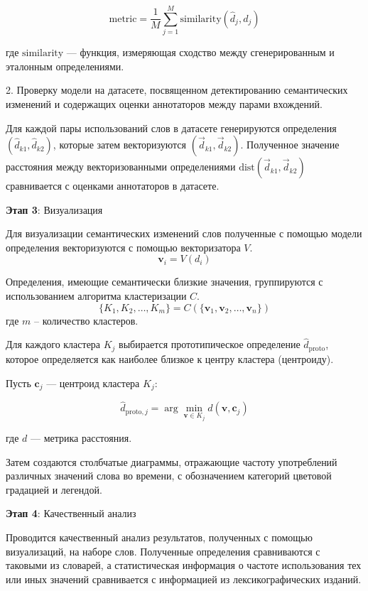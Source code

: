 \documentclass[LI,VKR]{HSEUniversity}
\begin{document}
\[
\text{metric} = \frac{1}{M} \sum_{j=1}^{M} \text{similarity}(\hat{d}_j, d_j)
\]

где \(\text{similarity}\) — функция, измеряющая сходство между сгенерированным и эталонным определениями.

2. Проверку модели на датасете, посвященном детектированию семантических изменений и
содержащих оценки аннотаторов между парами вхождений.

Для каждой пары использований слов в датасете генерируются определения \( (\hat{d}_{k1}, \hat{d}_{k2}) \),
которые затем векторизуются \( (\vec{d}_{k1}, \vec{d}_{k2}) \).
Полученное значение расстояния между векторизованными определениями \( \text{dist}(\vec{d}_{k1}, \vec{d}_{k2}) \)
сравнивается с оценками аннотаторов в датасете.

\textbf{Этап 3}: Визуализация

Для визуализации семантических изменений слов полученные с помощью модели определения векторизуются
с помощью векторизатора \( V \).
   \[
   \mathbf{v}_i = V(d_i)
   \]

Определения, имеющие семантически близкие значения,
группируются с использованием алгоритма кластеризации \( C \).
   \[
   \{K_1, K_2, \ldots, K_m\} = C(\{\mathbf{v}_1, \mathbf{v}_2, \ldots, \mathbf{v}_n\})
   \]
   где \( m \) – количество кластеров.

Для каждого кластера \( K_j \) выбирается прототипическое определение \( \hat{d}_{\text{proto}} \),
которое определяется как наиболее близкое к центру кластера (центроиду).

Пусть \( \mathbf{c}_j \) — центроид кластера \( K_j \):

\[ \hat{d}_{\text{proto}, j} = \arg\min_{\mathbf{v} \in K_j} d(\mathbf{v}, \mathbf{c}_j) \]

где \( d \) — метрика расстояния.

Затем создаются столбчатые диаграммы,
отражающие частоту употреблений различных значений слова во времени,
с обозначением категорий цветовой градацией и легендой.

\textbf{Этап 4}: Качественный анализ

Проводится качественный анализ результатов, полученных с помощью визуализаций,
на наборе слов.
Полученные определения сравниваются с таковыми из словарей,
а статистическая информация о частоте использования тех или иных значений сравнивается
с информацией из лексикографических изданий.
\end{document}
